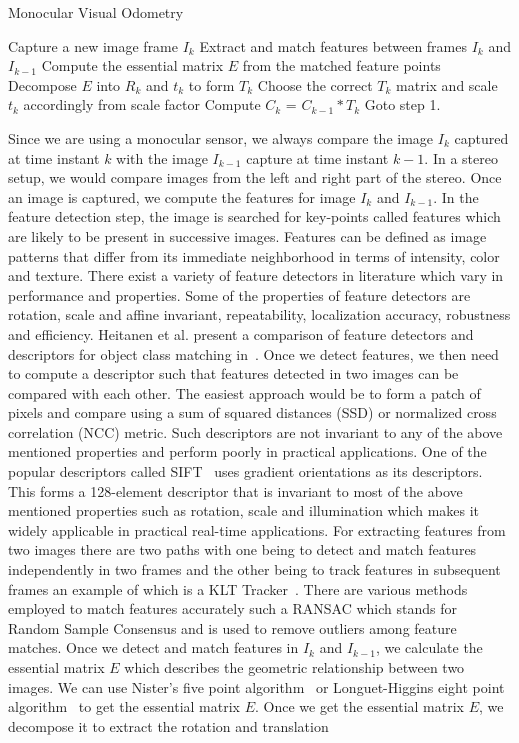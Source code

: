 \begin{algorithm}
    \caption{Monocular Visual Odometry}
	\begin{algorithmic}[1]
		\STATE Capture a new image frame $I_k$
    	\STATE Extract and match features between frames $I_k$ and $I_{k-1}$
    	\STATE Compute the essential matrix $E$ from the matched feature points
    	\STATE Decompose $E$ into $R_k$ and $t_k$ to form $T_k$
    	\STATE Choose the correct $T_k$ matrix and scale $t_k$ accordingly from scale factor
    	\STATE Compute $C_k$ = $C_{k-1}*T_k$
    	\STATE Goto step 1.
	\end{algorithmic}
\end{algorithm}

Since we are using a monocular sensor, we always compare the image $I_k$ captured at time instant $k$ with the image $I_{k-1}$ capture at time instant $k-1$. In a stereo setup, we would compare images from the left and right part of the stereo. Once an image is captured, we compute the features for image $I_k$ and $I_{k-1}$. In the feature detection step, the image is searched for key-points called features  which are likely to be present in successive images. Features can be defined as image patterns that differ from its immediate neighborhood in terms of intensity, color and texture. There exist a variety of feature detectors in literature which vary in performance and properties. Some of the properties of feature detectors are rotation, scale and affine invariant, repeatability, localization accuracy, robustness and efficiency.  Heitanen et al. present a comparison of feature detectors and descriptors for object class matching in~\cite{hietanen2016comparison}. Once we detect features, we then need to compute a descriptor such that features detected in two images can be compared with each other. The easiest approach would be to form a patch of pixels and compare using a sum of squared distances (SSD) or normalized cross correlation (NCC) metric. Such descriptors are not invariant to any of the above mentioned properties and perform poorly in practical applications. One of the popular descriptors called SIFT~\cite{lowe2004distinctive} uses gradient orientations as its descriptors. This forms a 128-element descriptor that is invariant to most of the above mentioned properties such as rotation, scale and illumination which makes it widely applicable in practical real-time applications. For extracting features from two images there are two paths with one being to detect and match features independently in two frames and the other being to track features in subsequent frames an example of which is a KLT Tracker~\cite{tomasi1991detection}. There are various methods employed to match features accurately such a RANSAC which stands for Random Sample Consensus and is used to remove outliers among feature matches. Once we detect and match features in $I_k$ and $I_{k-1}$, we calculate the essential matrix $E$ which describes the geometric relationship between two images. We can use Nister’s five point algorithm~\cite{nister2004efficient} or Longuet-Higgins eight point algorithm~\cite{longuet1981computer} to get the essential matrix $E$. Once we get the essential matrix $E$, we decompose it to extract the rotation and translation 